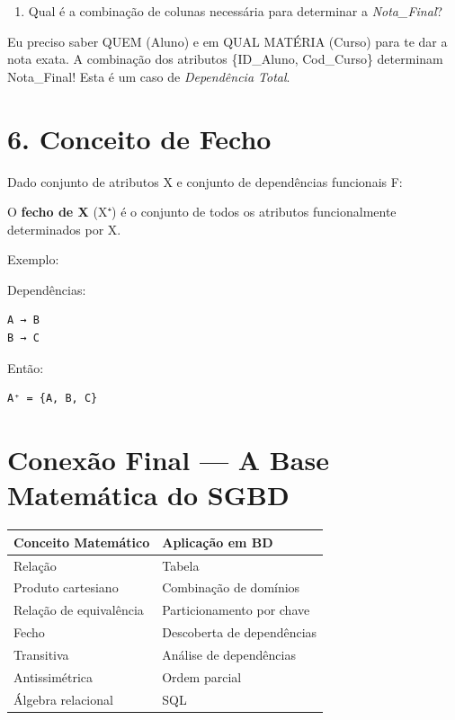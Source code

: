 \documentclass[
]{book}
\providecommand{\tightlist}{%
  \setlength{\itemsep}{0pt}\setlength{\parskip}{0pt}}
\begin{document}
\begin{enumerate}
\def\labelenumi{\arabic{enumi})}
\setcounter{enumi}{1}
\tightlist
\item
  Qual é a combinação de colunas necessária para determinar a \emph{Nota\_Final}?
\end{enumerate}

Eu preciso saber QUEM (Aluno) e em QUAL MATÉRIA (Curso) para te dar a nota exata. A combinação dos atributos \{ID\_Aluno, Cod\_Curso\} determinam Nota\_Final! Esta é um caso de \emph{Dependência Total}.

\section{6. Conceito de Fecho}\label{conceito-de-fecho}

Dado conjunto de atributos X e conjunto de dependências funcionais F:

O \textbf{fecho de X} (X⁺) é o conjunto de todos os atributos funcionalmente determinados por X.

Exemplo:

Dependências:

\begin{verbatim}
A → B
B → C
\end{verbatim}

Então:

\begin{verbatim}
A⁺ = {A, B, C}
\end{verbatim}

\section{Conexão Final --- A Base Matemática do SGBD}\label{conexuxe3o-final-a-base-matemuxe1tica-do-sgbd}

\begin{longtable}[]{@{}ll@{}}
\toprule\noalign{}
Conceito Matemático & Aplicação em BD \\
\midrule\noalign{}
\endhead
\bottomrule\noalign{}
\endlastfoot
Relação & Tabela \\
Produto cartesiano & Combinação de domínios \\
Relação de equivalência & Particionamento por chave \\
Fecho & Descoberta de dependências \\
Transitiva & Análise de dependências \\
Antissimétrica & Ordem parcial \\
Álgebra relacional & SQL \\
\end{longtable}
\end{document}
